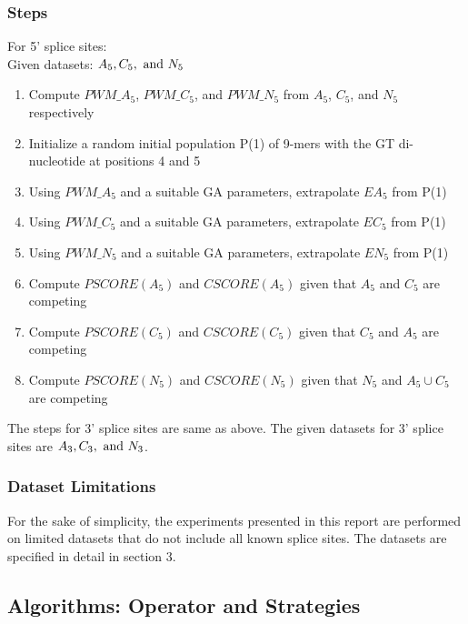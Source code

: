 \documentclass[12pt,a4paper]{article}
\begin{document}
	\subsubsection{Steps} \label{sec:steps}
	For 5' splice sites:\\
	Given datasets: $A_5, C_5,\textnormal{ and }N_5$
	\begin{enumerate}
		\item Compute $PWM\_A_5$, $PWM\_C_5$, and $PWM\_N_5$ from $A_5$, $C_5$, and $N_5$ respectively
		\item Initialize a random initial population P(1) of 9-mers with the GT di-nucleotide at positions 4 and 5
		\item Using $PWM\_A_5$ and a suitable GA parameters, extrapolate $EA_5$ from P(1)
		\item Using $PWM\_C_5$ and a suitable GA parameters, extrapolate $EC_5$ from P(1)
		\item Using $PWM\_N_5$ and a suitable GA parameters, extrapolate $EN_5$ from P(1)
		\item Compute $PSCORE(A_5)$ and $CSCORE(A_5)$ given that $A_5$ and $C_5$ are competing
		\item Compute $PSCORE(C_5)$ and $CSCORE(C_5)$ given that $C_5$ and $A_5$ are competing
		\item Compute $PSCORE(N_5)$ and $CSCORE(N_5)$ given that $N_5$ and $A_5 \cup C_5$ are competing
	\end{enumerate}
	
	The steps for 3' splice sites are same as above. The given datasets for 3' splice sites are $A_3, C_3,\textnormal{ and }N_3$.
	
	\subsubsection{Dataset Limitations}
	For the sake of simplicity, the experiments presented in this report are performed on limited datasets that do not include all known splice sites. The datasets are specified in detail in section 3.
	
	\subsection{Algorithms: Operator and Strategies}
\end{document}
